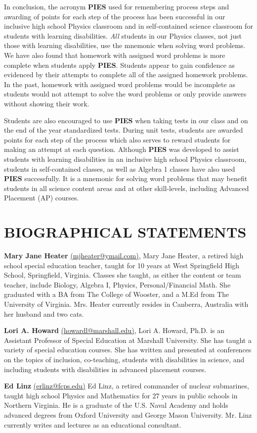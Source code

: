 \documentclass[11.5pt]{sig-alternate} %
\begin{document}
\begin{large}
In conclusion, the acronym \textbf{PIES} used for remembering process steps and awarding of points for each step of the process has been successful in our inclusive high school Physics classroom and in self-contained science classroom for students with learning disabilities. \textit{All} students in our Physics classes, not just those with learning disabilities, use the mnemonic when solving word problems. We have also found that homework with assigned word problems is more complete when students apply \textbf{PIES}.  Students appear to gain confidence as evidenced by their attempts to complete all of the assigned homework problems. In the past, homework with assigned word problems would be incomplete as students would not attempt to solve the word problems or only provide answers without showing their work.  

Students are also encouraged to use \textbf{PIES} when taking tests in our class and on the end of the year standardized tests.  During unit tests, students are awarded points for each step of the process which also serves to reward students for making an attempt at each question. Although \textbf{PIES} was developed to assist students with learning disabilities in an inclusive high school Physics classroom, students in self-contained classes, as well as Algebra 1 classes have also used \textbf{PIES} successfully. It is a mnemonic for solving word problems that may benefit students in all science content areas and at other skill-levels, including Advanced Placement (AP) courses. 

\section*{BIOGRAPHICAL STATEMENTS}
\textbf{Mary Jane Heater} \href{mailto:mjheater@ymail.com}{(mjheater@ymail.com)}, Mary Jane Heater, a retired high school special education teacher, taught for 10 years at West Springfield High School, Springfield, Virginia. Classes she taught, as either the content or team teacher, include Biology, Algebra I, Physics, Personal/Financial Math. She graduated with a BA from The College of Wooster, and a M.Ed from The University of Virginia. Mrs. Heater currently resides in Canberra, Australia with her husband and two cats.

\textbf{Lori A. Howard} \href{mailto:howardl@marshall.edu}{(howardl@marshall.edu)}, Lori A. Howard, Ph.D. is an Assistant Professor of Special Education at Marshall University. She has taught a variety of special education courses. She has written and presented at conferences on the topics of inclusion, co-teaching, students with disabilities in science, and including students with disabilities in advanced placement courses.

\textbf{Ed Linz} \href{mailto:erlinz@fcps.edu}{(erlinz@fcps.edu)} Ed Linz, a retired commander of nuclear submarines, taught high school Physics and Mathematics for 27 years in public schools in Northern Virginia. He is a graduate of the U.S. Naval Academy and holds advanced degrees from Oxford University and George Mason University. Mr. Linz currently writes and lectures as an educational consultant.

\end{large}
\clearpage
\end{document}
